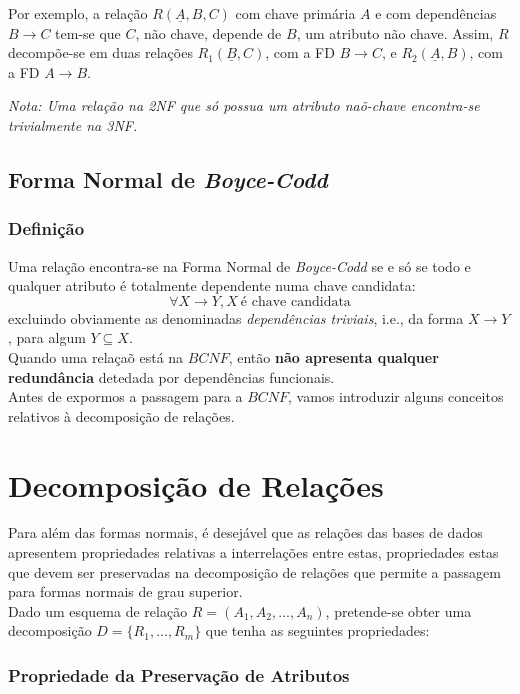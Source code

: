\documentclass[oneside]{book}
\theoremstyle{definition}
\begin{document}
Por exemplo, a relação $R(\underline{A}, B, C)$ com chave primária $A$ e com dependências $B \rightarrow C$ tem-se que $C$, não chave, depende de $B$, um atributo não chave. Assim, $R$ decompõe-se em duas relações $R_1(\underline{B}, C)$, com a FD $B \rightarrow C$, e $R_2(\underline{A}, B)$, com a FD $A \rightarrow B$.

\vspace*{0.3em}
\textit{Nota: Uma relação na 2NF que só possua um atributo naõ-chave encontra-se trivialmente na 3NF.}

\subsection{Forma Normal de \textit{Boyce-Codd}}

\subsubsection*{Definição}

Uma relação encontra-se na Forma Normal de \textit{Boyce-Codd} se e só se todo e qualquer atributo é totalmente dependente numa chave candidata:
\[
    \forall X \rightarrow Y, X \: \text{é chave candidata}
\]
excluindo obviamente as denominadas \textit{dependências triviais}, i.e., da forma $X \rightarrow Y$, para algum $Y \subseteq X$. \\
Quando uma relaçaõ está na $BCNF$, então \textbf{não apresenta qualquer redundância} detedada por dependências funcionais.\\
Antes de expormos a passagem para a $BCNF$, vamos introduzir alguns conceitos relativos à decomposição de relações.

\section{Decomposição de Relações}

Para além das formas normais, é desejável que as relações das bases de dados apresentem propriedades relativas a interrelações entre estas, propriedades estas que devem ser preservadas na decomposição de relações que permite a passagem para formas normais de grau superior. \\
Dado um esquema de relação $R = (A_1, A_2, ..., A_n)$, pretende-se obter uma decomposição $D = \{ R_1, ..., R_m\}$ que tenha as seguintes propriedades:

\subsubsection*{Propriedade da Preservação de Atributos}
\end{document}
